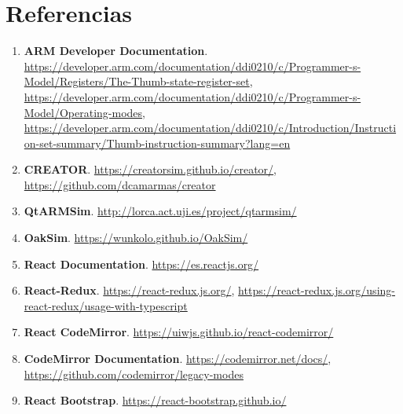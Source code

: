 \newpage
\section{Referencias}
{
    \begin{enumerate}
        \item \textbf{ARM Developer Documentation}.
            \href{https://developer.arm.com/documentation/ddi0210/c/Programmer-s-Model/Registers/The-Thumb-state-register-set}{https://developer.arm.com/documentation/ddi0210/c/Programmer-s-Model/Registers/The-Thumb-state-register-set}, 
            \href{https://developer.arm.com/documentation/ddi0210/c/Programmer-s-Model/Operating-modes}{https://developer.arm.com/documentation/ddi0210/c/Programmer-s-Model/Operating-modes},
            \href{https://developer.arm.com/documentation/ddi0210/c/Introduction/Instruction-set-summary/Thumb-instruction-summary?lang=en}{https://developer.arm.com/documentation/ddi0210/c/Introduction/Instruction-set-summary/Thumb-instruction-summary?lang=en}
        \item \textbf{CREATOR}.
            \href{https://creatorsim.github.io/creator/}{https://creatorsim.github.io/creator/},
            \href{https://github.com/dcamarmas/creator}{https://github.com/dcamarmas/creator}
        \item \textbf{QtARMSim}.
            \href{http://lorca.act.uji.es/project/qtarmsim/}{http://lorca.act.uji.es/project/qtarmsim/}
        \item \textbf{OakSim}.
            \href{https://wunkolo.github.io/OakSim/}{https://wunkolo.github.io/OakSim/}
        \item \textbf{React Documentation}.
            \href{https://es.reactjs.org/}{https://es.reactjs.org/}
        \item \textbf{React-Redux}.
            \href{https://react-redux.js.org/}{https://react-redux.js.org/},
            \href{https://react-redux.js.org/using-react-redux/usage-with-typescript}{https://react-redux.js.org/using-react-redux/usage-with-typescript}
        \item \textbf{React CodeMirror}.
            \href{https://uiwjs.github.io/react-codemirror/}{https://uiwjs.github.io/react-codemirror/}
        \item \textbf{CodeMirror Documentation}.
            \href{https://codemirror.net/docs/}{https://codemirror.net/docs/},
            \href{https://github.com/codemirror/legacy-modes}{https://github.com/codemirror/legacy-modes}
        \item \textbf{React Bootstrap}.
            \href{https://react-bootstrap.github.io/}{https://react-bootstrap.github.io/}
    \end{enumerate}
}

\newpage

\appendix
\addappheadtotoc




